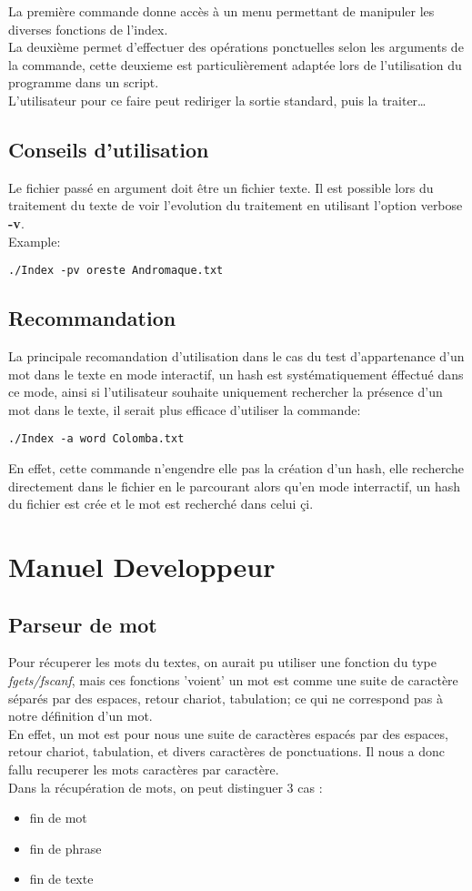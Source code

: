 \documentclass[french, 12pt, titlepage]{article}
\begin{document}
La première commande donne accès à un menu permettant de manipuler les
diverses fonctions de l'index.\\
La deuxième permet d'effectuer des opérations ponctuelles selon les
arguments de la commande, cette deuxieme est particulièrement adaptée
lors de l'utilisation du programme dans un script.\\
L'utilisateur pour ce faire peut rediriger la sortie standard, puis la
traiter\dots

\subsection{Conseils d'utilisation}
Le fichier passé en argument doit être un fichier texte. Il est possible lors du
traitement du texte de voir l'evolution du traitement en utilisant l'option
verbose \textbf{-v}.\\
Example:
\begin{lstlisting}
./Index -pv oreste Andromaque.txt
\end{lstlisting}

\subsection{Recommandation}
La principale recomandation d'utilisation dans le cas du test d'appartenance
 d'un mot dans le texte en mode interactif, un hash est
 systématiquement éffectué dans ce mode, ainsi si l'utilisateur
 souhaite uniquement rechercher la présence d'un mot dans le texte, il
 serait plus efficace d'utiliser la commande:
\begin{lstlisting}
./Index -a word Colomba.txt
\end{lstlisting}
En effet, cette commande n'engendre elle pas la création d'un hash,
elle recherche directement dans le fichier en le parcourant alors
qu'en mode interractif, un hash du fichier est crée et le mot est
recherché dans celui çi.

\section{Manuel Developpeur}
\subsection{Parseur de mot}
Pour récuperer les mots du textes, on aurait pu utiliser une fonction
du type \textit{fgets/fscanf}, mais ces fonctions 'voient' un
mot est comme une suite de caractère séparés par des espaces, retour
chariot, tabulation; ce qui ne correspond pas à notre définition d'un mot.\\
En effet, un mot est pour nous une suite de caractères espacés par des
espaces, retour chariot, tabulation, et divers caractères de
ponctuations. Il nous a donc fallu recuperer les mots caractères
par caractère.\\
Dans la récupération de mots, on peut distinguer 3 cas :
\begin{itemize}
\item fin de mot
\item fin de phrase
\item fin de texte
\end{itemize}
\end{document}
